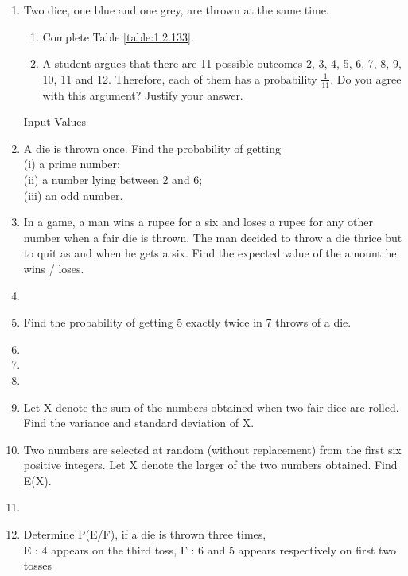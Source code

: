 \renewcommand{\theequation}{\theenumi}
\begin{enumerate}[label=\thesection.\arabic*.,ref=\thesection.\theenumi]


\item Two dice, one blue and one grey, are thrown at the same time.  
\begin{enumerate}
\item  Complete Table \ref{table:1.2.133}.
\item  A student argues that there are 11 possible outcomes 2, 3, 4, 5, 6, 7, 8, 9, 10, 11 and 12. Therefore, each of them has a probability $\frac{1}{11}$. Do you agree with this argument? Justify your answer.
\end{enumerate}
%
\begin{table}[ht!]
\centering

\caption{Input Values}
\label{table:1.2.133}	
\end{table}
\item A die is thrown once. Find the probability of getting\\
(i) a prime number;\\
(ii) a number lying between 2 and 6;\\
(iii) an odd number.
\\
\solution

\item In a game, a man wins a rupee for a six and loses a rupee for any other number when a fair die is thrown. The man decided to throw a die thrice but to quit as and when he gets a six. Find the expected value of the amount he wins / loses.\\
\item 
\item Find the probability of getting 5 exactly twice in 7 throws of a die.\\
\solution


\item 

\item
\item 
\item Let X denote the sum of the numbers obtained when two fair dice are rolled. Find the variance and standard deviation of X.\\
\solution

%
\item Two numbers are selected at random (without replacement) from the first six positive integers. Let X denote the larger of the two numbers obtained. Find E(X).\\
%
\solution

\item
\item Determine P(E/F), if a die is thrown three times,\\
E : 4 appears on the third toss, F : 6 and 5 appears respectively on first two tosses\\


\end{enumerate}
